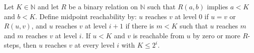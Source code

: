 \begin{theorem}
\label{Complexity.LogProg.SavitchARM.reach_of_reflTransGen}
\leanok
{}
Let $K\in\mathbb{N}$ and let $R$ be a binary relation on $\mathbb{N}$ such that
$R(a,b)$ implies $a<K$ and $b<K$. Define midpoint reachability by: $u$ reaches $v$ at
level $0$ if $u=v$ or $R(u,v)$, and $u$ reaches $v$ at level $i+1$ if there is $m<K$
such that $u$ reaches $m$ and $m$ reaches $v$ at level $i$. If $u<K$ and $v$ is
reachable from $u$ by zero or more $R$-steps, then $u$ reaches $v$ at every level $i$
with $K\le 2^i$.
\end{theorem}
